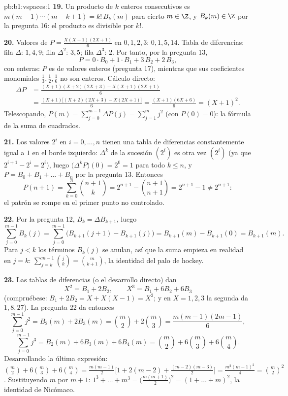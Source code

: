 \begin{solution}{pb:b1:vspaces:1}
\textbf{19.} Un producto de $k$ enteros consecutivos es
$m(m-1) \cdots(m-k+1) = k!\,B_k(m)$ para cierto $m \in \Z$, y
$B_k(m) \in \Z$ por la pregunta 16: el producto es divisible por $k!$.

\textbf{20.} Valores de $P = \frac{X(X+1)(2X+1)}{6}$ en $0,1,2,3$:
$0, 1, 5, 14$. Tabla de diferencias: fila $\Delta$: $1, 4, 9$; fila
$\Delta^2$: $3, 5$; fila $\Delta^3$: $2$. Por tanto, por la
pregunta 13,
\[
P = 0\cdot B_0 + 1\cdot B_1 + 3\,B_2 + 2\,B_3 ,
\]
con  enteras: $P$ es de valores enteros (pregunta 17),
mientras que sus coeficientes monomiales $\frac13, \frac12,
\frac16$ no son enteros. Cálculo directo:
\begin{align*}
\Delta P &= \frac{(X+1)(X+2)(2X+3) - X(X+1)(2X+1)}{6} \\
&= \frac{(X+1)\bigl[(X+2)(2X+3) - X(2X+1)\bigr]}{6}
= \frac{(X+1)(6X+6)}{6} = (X+1)^2 .
\end{align*}
Telescopando, $P(m) = \sum_{j=0}^{m-1}\Delta P(j) = \sum_{j=1}^{m}
j^2$ (con $P(0) = 0$): la fórmula de la suma de cuadrados.

\textbf{21.} Los valores $2^i$ en $i = 0, \dots, n$ tienen una tabla
de diferencias constantemente igual a $1$ en el borde izquierdo:
$\Delta^k$ de la sucesión $(2^i)$ es otra vez $(2^i)$ (ya que
$2^{i+1} - 2^i = 2^i$), luego $\bigl(\Delta^k P\bigr)(0) = 2^0 = 1$
para todo $k \leq n$, y $P = B_0 + B_1 + \dots + B_n$ por la
pregunta 13. Entonces
\[
P(n+1) = \sum_{k=0}^{n}\binom{n+1}{k}
= 2^{n+1} - \binom{n+1}{n+1} = 2^{n+1} - 1 \neq 2^{n+1}:
\]
el patrón se rompe en el primer punto no controlado.

\textbf{22.} Por la pregunta 12, $B_k = \Delta B_{k+1}$, luego
\[
\sum_{j=0}^{m-1} B_k(j)
= \sum_{j=0}^{m-1}\bigl(B_{k+1}(j+1) - B_{k+1}(j)\bigr)
= B_{k+1}(m) - B_{k+1}(0) = B_{k+1}(m).
\]
Para $j < k$ los términos $B_k(j)$ se anulan, así que la suma empieza
en realidad en $j = k$: $\sum_{j=k}^{m-1}\binom jk = \binom m{k+1}$,
la identidad del palo de hockey.

\textbf{23.} Las tablas de diferencias (o el desarrollo directo) dan
\[
X^2 = B_1 + 2 B_2, \qquad X^3 = B_1 + 6 B_2 + 6 B_3
\]
(compruébese: $B_1 + 2B_2 = X + X(X-1) = X^2$; y en $X = 1, 2, 3$ la
segunda da $1, 8, 27$). La pregunta 22 da entonces
\[
\sum_{j=0}^{m-1} j^2 = B_2(m) + 2B_3(m)
= \binom m2 + 2\binom m3 = \frac{m(m-1)(2m-1)}{6},
\]
\[
\sum_{j=0}^{m-1} j^3 = B_2(m) + 6B_3(m) + 6B_4(m)
= \binom m2 + 6\binom m3 + 6\binom m4 .
\]
Desarrollando la última expresión:
$\binom m2 + 6\binom m3 + 6\binom m4 = \frac{m(m-1)}{2}\bigl[1 +
2(m-2) + \frac{(m-2)(m-3)}{2}\bigr] = \frac{m^2(m-1)^2}{4} =
\binom m2^2$. Sustituyendo $m$ por $m + 1$:
$1^3 + \dots + m^3 = \bigl(\frac{m(m+1)}2\bigr)^2 =
(1 + \dots + m)^2$, la identidad de Nicómaco.


\end{solution}
